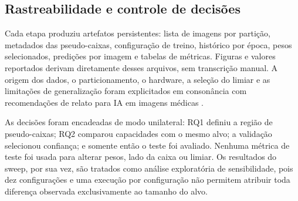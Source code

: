 \subsection{Rastreabilidade e controle de decis\~oes}

Cada etapa produziu artefatos persistentes: lista de imagens por parti\c{c}\~ao,
metadados das pseudo-caixas, configura\c{c}\~ao de treino, hist\'orico por \'epoca,
pesos selecionados, predi\c{c}\~oes por imagem e tabelas de m\'etricas. Figuras e
valores reportados derivam diretamente desses arquivos, sem transcri\c{c}\~ao
manual. A origem dos dados, o particionamento, o hardware, a sele\c{c}\~ao
do limiar e as limita\c{c}\~oes de generaliza\c{c}\~ao foram explicitados em
conson\^ancia com recomenda\c{c}\~oes de relato para IA em imagens m\'edicas
\cite{mongan2020claim,tejani2024claim,collins2024tripod}.

As decis\~oes foram encadeadas de modo unilateral: RQ1 definiu a regi\~ao de
pseudo-caixas; RQ2 comparou capacidades com o mesmo alvo; a valida\c{c}\~ao
selecionou confian\c{c}a; e somente ent\~ao o teste foi avaliado. Nenhuma m\'etrica
de teste foi usada para alterar pesos, lado da caixa ou limiar. Os resultados do
sweep, por sua vez, s\~ao tratados como an\'alise explorat\'oria de sensibilidade,
pois dez configura\c{c}\~oes e uma execu\c{c}\~ao por configura\c{c}\~ao n\~ao
permitem atribuir toda diferen\c{c}a observada exclusivamente ao tamanho do alvo.
